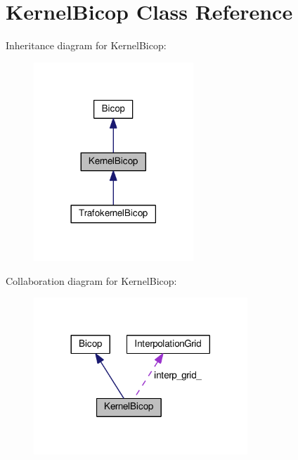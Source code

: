 \hypertarget{class_kernel_bicop}{}\section{Kernel\+Bicop Class Reference}
\label{class_kernel_bicop}


Inheritance diagram for Kernel\+Bicop\+:\nopagebreak
\begin{figure}[H]
\begin{center}
\leavevmode
\includegraphics[width=170pt]{class_kernel_bicop__inherit__graph}
\end{center}
\end{figure}


Collaboration diagram for Kernel\+Bicop\+:\nopagebreak
\begin{figure}[H]
\begin{center}
\leavevmode
\includegraphics[width=228pt]{class_kernel_bicop__coll__graph}
\end{center}
\end{figure}

